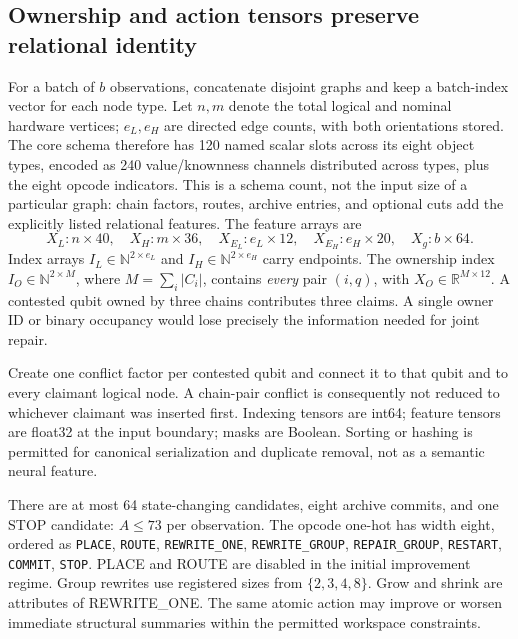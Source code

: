 \documentclass[11pt,a4paper]{article}
\newcommand{\code}[1]{\texttt{\small #1}}
\theoremstyle{definition}\newtheorem{definition}[proposition]{Definition}
\begin{document}
\subsection{Ownership and action tensors preserve relational identity}

For a batch of \(b\) observations, concatenate disjoint graphs and keep a batch-index vector for each node type. Let \(n,m\) denote the total logical and nominal hardware vertices; \(e_L,e_H\) are directed edge counts, with both orientations stored. The core schema therefore has 120 named scalar slots across its eight object types, encoded as 240 value/knownness channels distributed across types, plus the eight opcode indicators. This is a schema count, not the input size of a particular graph: chain factors, routes, archive entries, and optional cuts add the explicitly listed relational features. The feature arrays are
\[
 X_L\!:\!n\times40,\quad X_H\!:\!m\times36,\quad
 X_{E_L}\!:\!e_L\times12,\quad X_{E_H}\!:\!e_H\times20,
 \quad X_g\!:\!b\times64.
\]
Index arrays \(I_L\in\mathbb N^{2\times e_L}\) and \(I_H\in\mathbb N^{2\times e_H}\) carry endpoints. The ownership index \(I_O\in\mathbb N^{2\times M}\), where \(M=\sum_i|C_i|\), contains \emph{every} pair \((i,q)\), with \(X_O\in\mathbb R^{M\times12}\). A contested qubit owned by three chains contributes three claims. A single owner ID or binary occupancy would lose precisely the information needed for joint repair.

Create one conflict factor per contested qubit and connect it to that qubit and to every claimant logical node. A chain-pair conflict is consequently not reduced to whichever claimant was inserted first. Indexing tensors are int64; feature tensors are float32 at the input boundary; masks are Boolean. Sorting or hashing is permitted for canonical serialization and duplicate removal, not as a semantic neural feature.

There are at most 64 state-changing candidates, eight archive commits, and one STOP candidate: \(A\le73\) per observation. The opcode one-hot has width eight, ordered as \code{PLACE}, \code{ROUTE}, \code{REWRITE\_ONE}, \code{REWRITE\_GROUP}, \code{REPAIR\_GROUP}, \code{RESTART}, \code{COMMIT}, \code{STOP}. PLACE and ROUTE are disabled in the initial improvement regime. Group rewrites use registered sizes from \(\{2,3,4,8\}\). Grow and shrink are attributes of REWRITE\_ONE. The same atomic action may improve or worsen immediate structural summaries within the permitted workspace constraints.
\end{document}
